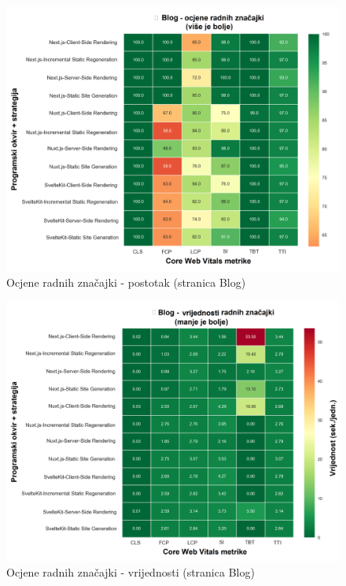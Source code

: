 \begin{figure}[H]
    \centering
    \includegraphics[width=\textwidth]{slike/rezultati/blog/blog_performance_scores.png}
    \caption{Ocjene radnih značajki - postotak (stranica Blog)}
    \label{fig:testiranje-blog-postotak}
\end{figure}

\begin{figure}[H]
    \centering
    \includegraphics[width=\textwidth]{slike/rezultati/blog/blog_performance_values.png}
    \caption{Ocjene radnih značajki - vrijednosti (stranica Blog)}
    \label{fig:testiranje-blog-vrijednosti}
\end{figure}

